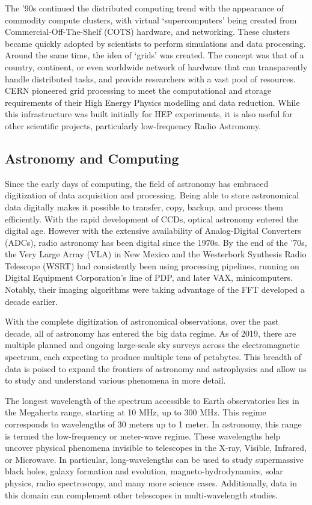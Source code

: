 The '90s continued the distributed computing trend with the appearance of commodity compute clusters, with virtual `supercomputers' being created from Commercial-Off-The-Shelf (COTS) hardware, and networking. These clusters became quickly adopted by scientists to perform simulations and data processing. Around the same time, the idea of `grids' was created\citep{cheng1989software}. The concept was that of a country, continent, or even worldwide network of hardware that can transparently handle distributed tasks, and provide researchers with a vast pool of resources. CERN pioneered grid processing to meet the computational and storage requirements of their High Energy Physics modelling and data reduction. While this infrastructure was built initially for HEP experiments, it is also useful for other scientific projects, particularly low-frequency Radio Astronomy. 


\subsection{Astronomy and Computing}

Since the early days of computing, the field of astronomy has embraced digitization of data acquisition and processing. Being able to store astronomical data digitally makes it possible to transfer, copy, backup, and process them efficiently. With the rapid development of CCDs, optical astronomy entered the digital age. However with the extensive availability of Analog-Digital Converters (ADCs), radio astronomy has been digital since the 1970s. By the end of the '70s, the Very Large Array (VLA) in New Mexico and the Westerbork Synthesis Radio Telescope (WSRT) had consistently been using processing pipelines, running on Digital Equipment Corporation's line of PDP, and later VAX, minicomputers. Notably, their imaging algorithms were taking advantage of the FFT developed a decade earlier\citep{clark1980_clean}.

With the complete digitization of astronomical observations, over the past decade,  all of astronomy has entered the big data regime. As of 2019, there are multiple planned and ongoing large-scale sky surveys across the electromagnetic spectrum, each expecting to produce multiple tens of petabytes. This breadth of data is poised to expand the frontiers of astronomy and astrophysics and allow us to study and understand various phenomena in more detail.

The longest wavelength of the spectrum accessible to Earth observatories lies in the Megahertz range, starting at 10 MHz, up to 300 MHz. This regime corresponds to wavelengths of 30 meters up to 1 meter. In astronomy, this range is termed the low-frequency or meter-wave regime. These wavelengths help uncover physical phenomena invisible to telescopes in the X-ray, Visible, Infrared, or Microwave. In particular, long-wavelengths can be used to study supermassive black holes, galaxy formation and evolution, magneto-hydrodynamics, solar physics, radio spectroscopy, and many more science cases. Additionally, data in this domain can complement other telescopes in multi-wavelength studies.

